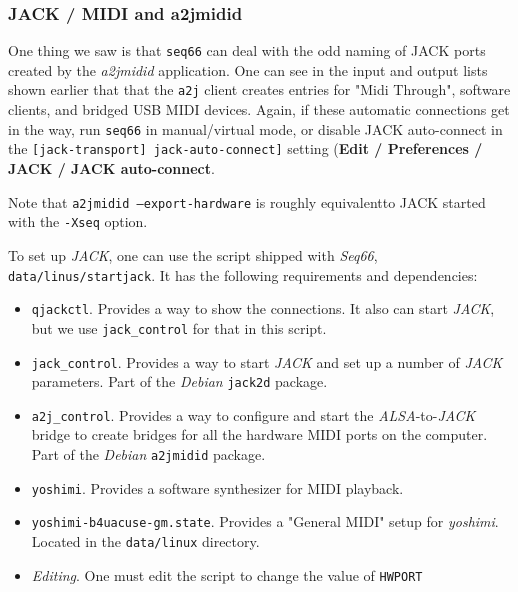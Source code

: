 \subsubsection{JACK / MIDI and a2jmidid}
\label{subsubsec:jack_midi_a2jmidid}

   One thing we saw is that \texttt{seq66} can deal with the odd naming
   of JACK ports created by the \textsl{a2jmidid} application.
   One can see in the input and output lists shown earlier
   that that the \texttt{a2j} client creates entries for "Midi Through",
   software clients, and bridged USB MIDI devices.
   Again, if these automatic connections get in the way, run \texttt{seq66} in
   manual/virtual mode, or disable JACK auto-connect in the
   \texttt{[jack-transport] jack-auto-connect]} setting
   (\textbf{Edit / Preferences / JACK / JACK auto-connect}.

   Note that \texttt{a2jmidid --export-hardware} is roughly
   equivalentto JACK started with the \texttt{-Xseq} option.

   To set up \textsl{JACK}, one can use the script shipped with
   \textsl{Seq66}, \texttt{data/linus/startjack}.  It has the following
   requirements and dependencies:

   \begin{itemize}
      \item \texttt{qjackctl}.  Provides a way to show the connections. It also
         can start \textsl{JACK}, but we use \texttt{jack\_control} for that in
         this script.
      \item \texttt{jack\_control}.  Provides a way to start \textsl{JACK}
         and set up a number of \textsl{JACK} parameters.
         Part of the \textsl{Debian} \texttt{jack2d} package.
      \item \texttt{a2j\_control}.  Provides a way to configure and start the
         \textsl{ALSA}-to-\textsl{JACK} bridge to create bridges for all the
         hardware MIDI ports on the computer.
         Part of the \textsl{Debian} \texttt{a2jmidid} package.
      \item \texttt{yoshimi}.  Provides a software synthesizer for MIDI
         playback.
      \item \texttt{yoshimi-b4uacuse-gm.state}.  Provides a "General MIDI"
      setup for \textsl{yoshimi}.  Located in the \texttt{data/linux}
      directory.
      \item \textsl{Editing}.  One must edit the script to change the value of
      \texttt{HWPORT}
   \end{itemize}

